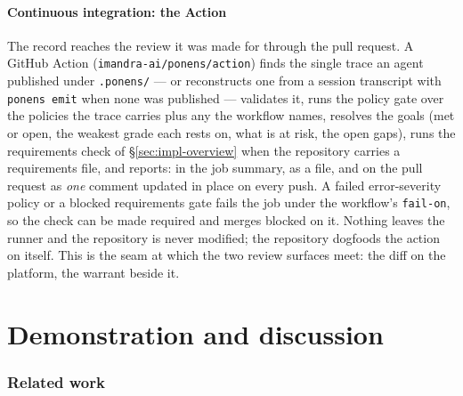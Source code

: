 \documentclass[11pt]{article}
\newcommand{\codeus}{\textunderscore\penalty100\relax}
\newcommand{\code}[1]{\texttt{\let\_\codeus #1}}
\begin{document}
\subsection{Continuous integration: the Action}\label{sec:impl-action}

The record reaches the review it was made for through the pull request. A GitHub Action
(\code{imandra-ai/ponens/action}) finds the single trace an agent published under \code{.ponens/} --- or
reconstructs one from a session transcript with \code{ponens emit} when none was published --- validates it,
runs the policy gate over the policies the trace carries plus any the workflow names, resolves the goals
(met or open, the weakest grade each rests on, what is at risk, the open gaps), runs the requirements check
of \S\ref{sec:impl-overview} when the repository carries a requirements file, and reports: in the job
summary, as a file, and on the pull request as \emph{one} comment updated in place on every push. A failed
error-severity policy or a blocked requirements gate fails the job under the workflow's \code{fail-on}, so
the check can be made required and merges blocked on it. Nothing leaves the runner and the repository is
never modified; the repository dogfoods the action on itself. This is the seam at which the two review
surfaces meet: the diff on the platform, the warrant beside it.





\part{Demonstration and discussion}



\section{Related work}
\end{document}
